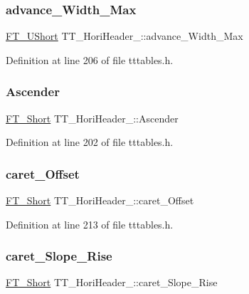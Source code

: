 \subsubsection{\texorpdfstring{advance\_Width\_Max}{advance\_Width\_Max}}
{\footnotesize\ttfamily \mbox{\hyperlink{fttypes_8h_a937f6c17cf5ffd09086d8610c37b9f58}{F\+T\+\_\+\+U\+Short}} T\+T\+\_\+\+Hori\+Header\+\_\+\+::advance\+\_\+\+Width\+\_\+\+Max}



Definition at line 206 of file tttables.\+h.

\mbox{\label{struct_t_t___hori_header___a6f987c89428c93854dab06e506134249}} 
\subsubsection{\texorpdfstring{Ascender}{Ascender}}
{\footnotesize\ttfamily \mbox{\hyperlink{fttypes_8h_aa7279be89046a2563cd3d4d6651fbdcf}{F\+T\+\_\+\+Short}} T\+T\+\_\+\+Hori\+Header\+\_\+\+::\+Ascender}



Definition at line 202 of file tttables.\+h.

\mbox{\label{struct_t_t___hori_header___a791ad767d54cc87e84d9b03d6739f0eb}} 
\subsubsection{\texorpdfstring{caret\_Offset}{caret\_Offset}}
{\footnotesize\ttfamily \mbox{\hyperlink{fttypes_8h_aa7279be89046a2563cd3d4d6651fbdcf}{F\+T\+\_\+\+Short}} T\+T\+\_\+\+Hori\+Header\+\_\+\+::caret\+\_\+\+Offset}



Definition at line 213 of file tttables.\+h.

\mbox{\label{struct_t_t___hori_header___aeb43d92f56de424d8f28bd389973eca4}} 
\subsubsection{\texorpdfstring{caret\_Slope\_Rise}{caret\_Slope\_Rise}}
{\footnotesize\ttfamily \mbox{\hyperlink{fttypes_8h_aa7279be89046a2563cd3d4d6651fbdcf}{F\+T\+\_\+\+Short}} T\+T\+\_\+\+Hori\+Header\+\_\+\+::caret\+\_\+\+Slope\+\_\+\+Rise}



